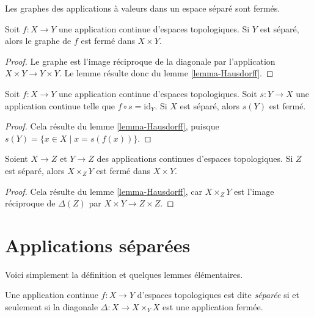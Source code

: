 \begin{lemma}
\label{lemma-graph-closed}
\begin{slogan}
Les graphes des applications à valeurs dans un espace séparé sont fermés.
\end{slogan}
Soit $f : X \to Y$ une application continue d'espaces topologiques.
Si $Y$ est séparé, alors le graphe de $f$ est fermé dans $X \times Y$.
\end{lemma}

\begin{proof}
Le graphe est l'image réciproque de la diagonale par l'application
$X \times Y \to Y \times Y$. Le lemme résulte donc du
lemme \ref{lemma-Hausdorff}.
\end{proof}

\begin{lemma}
\label{lemma-section-closed}
Soit $f : X \to Y$ une application continue d'espaces topologiques.
Soit $s : Y \to X$ une application continue telle que
$f \circ s = \text{id}_Y$.
Si $X$ est séparé, alors $s(Y)$ est fermé.
\end{lemma}

\begin{proof}
Cela résulte du lemme \ref{lemma-Hausdorff}, puisque
$s(Y) = \{x \in X \mid x = s(f(x))\}$.
\end{proof}

\begin{lemma}
\label{lemma-fibre-product-closed}
Soient $X \to Z$ et $Y \to Z$ des applications continues d'espaces
topologiques. Si $Z$ est séparé, alors $X \times_Z Y$ est fermé dans
$X \times Y$.
\end{lemma}

\begin{proof}
Cela résulte du lemme \ref{lemma-Hausdorff}, car $X \times_Z Y$ est l'image
réciproque de $\Delta(Z)$ par $X \times Y \to Z \times Z$.
\end{proof}




\section{Applications séparées}
\label{section-separated}

\noindent
Voici simplement la définition et quelques lemmes élémentaires.

\begin{definition}
\label{definition-separated}
Une application continue $f : X \to Y$ d'espaces topologiques est dite
{\it séparée} si et seulement si la diagonale $\Delta : X \to X \times_Y X$
est une application fermée.
\end{definition}

